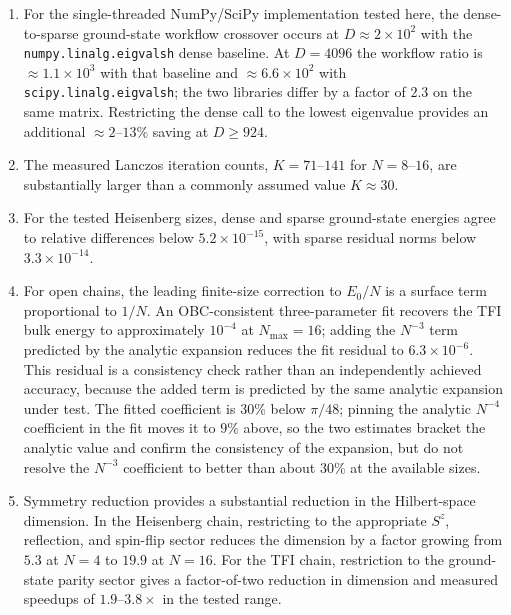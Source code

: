 \documentclass[pdflatex,sn-mathphys-num]{sn-jnl}
\begin{document}
\begin{enumerate}
  \item For the single-threaded NumPy/SciPy implementation tested
        here, the dense-to-sparse ground-state workflow crossover
        occurs at $D \approx 2\times10^{2}$ with the
        \texttt{numpy.linalg.eigvalsh} dense baseline. At
        $D = 4096$ the workflow ratio is $\approx 1.1\times10^{3}$
        with that baseline and $\approx 6.6\times10^{2}$ with
        \texttt{scipy.linalg.eigvalsh}; the two libraries differ by
        a factor of $2.3$ on the same matrix. Restricting the dense
        call to the lowest eigenvalue provides an additional
        $\approx 2$--$13\%$ saving at $D \geq 924$.

  \item The measured Lanczos iteration counts, $K = 71$--$141$ for
        $N = 8$--$16$, are substantially larger than a commonly
        assumed value $K \approx 30$.

  \item For the tested Heisenberg sizes, dense and sparse
        ground-state energies agree to relative differences below
        $5.2\times10^{-15}$, with sparse residual norms below
        $3.3\times10^{-14}$.

  \item For open chains, the leading finite-size correction to
        $E_0/N$ is a surface term proportional to $1/N$. An
        OBC-consistent three-parameter fit recovers the TFI bulk
        energy to approximately $10^{-4}$ at $N_{\max} = 16$;
        adding the $N^{-3}$ term predicted by the analytic
        expansion reduces the fit residual to $6.3\times10^{-6}$.
        This residual is a consistency check rather than an
        independently achieved accuracy, because the added term is
        predicted by the same analytic expansion under test. The
        fitted coefficient is $30\%$ below $\pi/48$; pinning the
        analytic $N^{-4}$ coefficient in the fit moves it to $9\%$
        above, so the two estimates bracket the analytic value and
        confirm the consistency of the expansion, but do not
        resolve the $N^{-3}$ coefficient to better than about
        $30\%$ at the available sizes.

  \item Symmetry reduction provides a substantial reduction in the
        Hilbert-space dimension. In the Heisenberg chain, restricting
        to the appropriate $S^z$, reflection, and spin-flip sector
        reduces the dimension by a factor growing from $5.3$ at
        $N=4$ to $19.9$ at $N=16$. For the TFI chain, restriction to
        the ground-state parity sector gives a factor-of-two
        reduction in dimension and measured speedups of
        $1.9$--$3.8\times$ in the tested range.


\end{enumerate}
\end{document}
